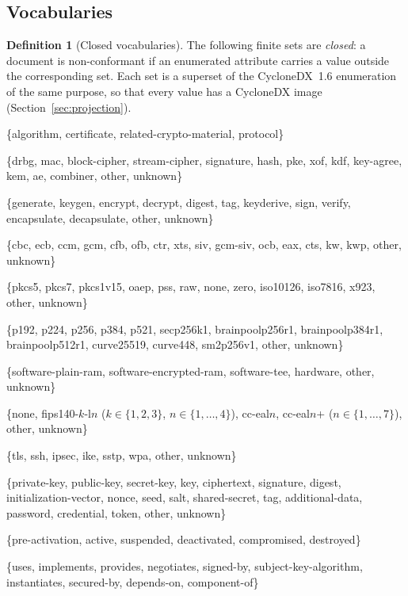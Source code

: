 \documentclass[11pt,a4paper]{article}
\theoremstyle{definition}
\newtheorem{definition}{Definition}[section]
\theoremstyle{plain}
\begin{document}
\subsection{Vocabularies}
\begin{definition}[Closed vocabularies]\label{def:vocab}
The following finite sets are \emph{closed}: a document is non-conformant if an enumerated
attribute carries a value outside the corresponding set. Each set is a superset of the
CycloneDX~1.6 enumeration of the same purpose, so that every value has a CycloneDX image
(Section~\ref{sec:projection}).
\begin{description}[nosep,leftmargin=2.6cm,style=nextline]
\item[$V_{\mathrm{type}}$] \{algorithm, certificate, related-crypto-material, protocol\}
\item[$V_{\mathrm{prim}}$] \{drbg, mac, block-cipher, stream-cipher, signature, hash, pke, xof, kdf, key-agree, kem, ae, combiner, other, unknown\}
\item[$V_{\mathrm{fn}}$] \{generate, keygen, encrypt, decrypt, digest, tag, keyderive, sign, verify, encapsulate, decapsulate, other, unknown\}
\item[$V_{\mathrm{mode}}$] \{cbc, ecb, ccm, gcm, cfb, ofb, ctr, xts, siv, gcm-siv, ocb, eax, cts, kw, kwp, other, unknown\}
\item[$V_{\mathrm{pad}}$] \{pkcs5, pkcs7, pkcs1v15, oaep, pss, raw, none, zero, iso10126, iso7816, x923, other, unknown\}
\item[$V_{\mathrm{curve}}$] \{p192, p224, p256, p384, p521, secp256k1, brainpoolp256r1, brainpoolp384r1, brainpoolp512r1, curve25519, curve448, sm2p256v1, other, unknown\}
\item[$V_{\mathrm{env}}$] \{software-plain-ram, software-encrypted-ram, software-tee, hardware, other, unknown\}
\item[$V_{\mathrm{cert}}$] \{none, fips140-$k$-l$n$ ($k\in\{1,2,3\}$, $n\in\{1,\dots,4\}$), cc-eal$n$, cc-eal$n$+ ($n\in\{1,\dots,7\}$), other, unknown\}
\item[$V_{\mathrm{proto}}$] \{tls, ssh, ipsec, ike, sstp, wpa, other, unknown\}
\item[$V_{\mathrm{mat}}$] \{private-key, public-key, secret-key, key, ciphertext, signature, digest, initialization-vector, nonce, seed, salt, shared-secret, tag, additional-data, password, credential, token, other, unknown\}
\item[$V_{\mathrm{state}}$] \{pre-activation, active, suspended, deactivated, compromised, destroyed\}
\item[$V_{\mathrm{rel}}$] \{uses, implements, provides, negotiates, signed-by, subject-key-algorithm, instantiates, secured-by, depends-on, component-of\}

\end{description}
\end{definition}
\end{document}
